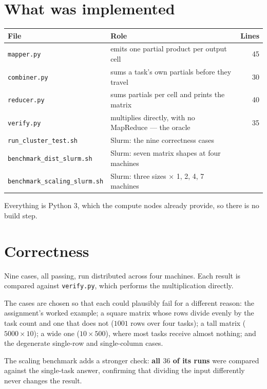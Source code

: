 \documentclass[11pt,a4paper]{article}
\begin{document}
\section{What was implemented}

\begin{center}\small
\begin{tabular}{@{}llr@{}}
\toprule
\textbf{File} & \textbf{Role} & \textbf{Lines} \\
\midrule
\texttt{mapper.py} & emits one partial product per output cell & 45 \\
\texttt{combiner.py} & sums a task's own partials before they travel & 30 \\
\texttt{reducer.py} & sums partials per cell and prints the matrix & 40 \\
\texttt{verify.py} & multiplies directly, with no MapReduce --- the oracle & 35 \\
\texttt{run\_cluster\_test.sh} & Slurm: the nine correctness cases & \\
\texttt{benchmark\_dist\_slurm.sh} & Slurm: seven matrix shapes at four machines & \\
\texttt{benchmark\_scaling\_slurm.sh} & Slurm: three sizes $\times$ 1, 2, 4, 7 machines & \\
\bottomrule
\end{tabular}
\end{center}

Everything is Python 3, which the compute nodes already provide, so there is no
build step.

\section{Correctness}

Nine cases, all passing, run distributed across four machines. Each result is
compared against \texttt{verify.py}, which performs the multiplication directly.

The cases are chosen so that each could plausibly fail for a different reason:
the assignment's worked example; a square matrix whose rows divide evenly by the
task count and one that does not ($1001$ rows over four tasks); a tall matrix
($5000 \times 10$); a wide one ($10 \times 500$), where most tasks receive
almost nothing; and the degenerate single-row and single-column cases.

The scaling benchmark adds a stronger check: \textbf{all $36$ of its runs} were
compared against the single-task answer, confirming that dividing the input
differently never changes the result.
\end{document}
